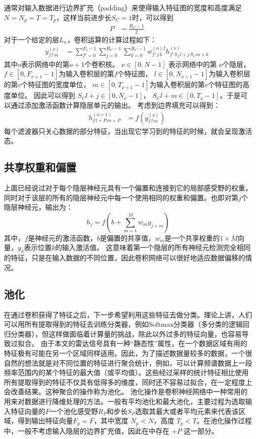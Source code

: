 通常对输入数据进行边界扩充（padding）来使得输入特征图的宽度和高度满足$ N = N_p = T = T_p $，这样当前进步长$ S_C = 1 $时，可以得到
\begin{align}
P&=\frac{R_C-1}{2}\;
\end{align}
对于一个给定的层$ L_n $，卷积运算的计算过程如下：
\begin{align}
y_{f\,l\,m}^{(\nu)}&=\sum^{F_\nu-1}_{f'=0}\sum^{R_C-1}_{j=0}\sum^{R_C-1}_{k=0}
w^{(o)f}_{f'\,j\,k}h^{(\nu)}_{f'\,S_Cl+j\,S_Cm+k}\;
\end{align}
其中$ o $表示网络中的第$ o + 1 $个卷积核。
$\nu \in [0,N-1 ]$ 表示网络中的第 $\nu$个隐层，$f\in[0,F_{\nu+1}-1]$为输入卷积层的第$f$个特征图， $l\in[0,N_{\nu+1}-1 ]$为输入卷积层的第$v$个特征图的宽度单位， $m\in[0,T_{\nu+1}-1 ]$为输入卷积层的第$v$个特征图的高度单位。 因此可以得到 $S_Cl+j\in[0,N_\nu-1 ]$， $S_Cl+m\in[0,T_\nu-1 ]$。于是可以通过添加激活函数计算隐层单元的输出。
考虑到边界填充可以得到：
\begin{align}
h_{f\,l+P\,m+P}^{(\nu+1)}&=f\left(y_{f\,l\,m}^{(\nu)}\right)\;
\end{align}
每个滤波器只关心数据的部分特征，当出现它学习到的特征的时候，就会呈现激活态。

\subsection{共享权重和偏置}
上面已经说过对于每个隐层神经元具有一个偏置和连接到它的局部感受野的权重，同时对于该层的所有的隐层神经元中每一个使用相同的权重和偏置。也即对第$j$个隐层神经元，输出为：
\begin{equation}
  h_j = f(b+\sum_{m=1}^M w_m y_{j+m})
  \label{equ:shared_weight}
\end{equation}
其中，$f$是神经元的激活函数，$b$是偏置的共享值，$w_m$是一个共享权重的$1\times M$向量，$y_k$表示位置$k$的输入激活值。
这意味着第一个隐层的所有神经元检测完全相同的特征，只是在输入数据的不同位置，因此卷积网络可以很好地适应数据偏移的情况。

\subsection{池化}
在通过卷积获得了特征之后，下一步希望利用这些特征去做分类。理论上讲，人们可以用所有提取得到的特征去训练分类器，例如Softmax分类器（多分类的逻辑回归分类器），但这样做面临着计算量的挑战，除此以外过多的特征向量，也容易导致过拟合。
由于本文的雷达信号具有一种“静态性”属性，在一个数据区域有用的特征极有可能在另一个区域同样适用。因此，为了描述数据量较多的数据，一个很自然的想法就是对不同位置的特征进行聚合统计，例如，可以计算频谱数据上一段频率范围内的某个特征的最大值（或平均值）。这些经过采样的统计特征相比使用所有提取得到的特征不仅具有低得多的维度，同时还不容易过拟合，在一定程度上会改善结果。这种聚合的操作称为池化。
池化操作是卷积神经网络中一种常用的用来对数据进行降维处理的方法。一般有平均池化和最大池化，主要过程为选取输入特征向量的$F$一个池化感受野$R_P$和步长$S_P$选取其最大或者平均元素来代表该区域，得到输出特征向量$F_p=F$，其中宽度 $N_p<N$，高度 $T_p<T$。在池化操作过程中，一般不考虑输入隐层的边界扩充值，因此在中存在 $+P$ 这一部分。


